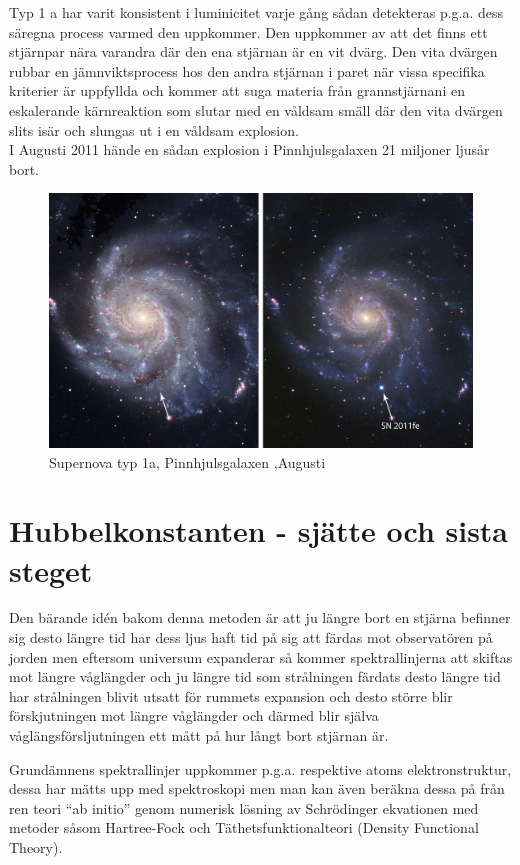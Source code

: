 \documentclass[./exercises.tex]{subfiles}
\begin{document}
Typ 1 a har varit konsistent i luminicitet varje gång sådan detekteras p.g.a. dess säregna process
varmed den uppkommer. Den uppkommer av att det finns ett stjärnpar nära varandra där den ena stjärnan är en vit dvärg.
Den vita dvärgen rubbar en jämnviktsprocess hos den andra stjärnan i paret när vissa specifika kriterier
är uppfyllda och kommer att suga materia från grannstjärnani en eskalerande kärnreaktion som slutar med en våldsam
smäll där den vita dvärgen slits isär och slungas ut i en våldsam explosion.\\
I Augusti 2011 hände en sådan explosion i Pinnhjulsgalaxen 21 miljoner ljusår bort.
\begin{figure}[H]
\begin{center}
  \includegraphics[scale=0.25]{SuperNova_2011fe.jpg}
  \caption{Supernova typ 1a, Pinnhjulsgalaxen ,Augusti }
  \end{center}
  \label{fig4}
\end{figure}
\section{Hubbelkonstanten - sjätte och sista steget}

Den bärande id\'en bakom denna metoden är att ju längre bort en stjärna befinner sig desto längre tid har dess
ljus haft tid på sig att färdas mot observatören på jorden men eftersom universum expanderar så kommer
spektrallinjerna att skiftas mot längre våglängder och ju längre tid som strålningen färdats desto längre tid
har strålningen blivit utsatt för rummets expansion och desto större blir förskjutningen mot längre våglängder
och därmed blir själva våglängsförsljutningen ett mått på hur långt bort stjärnan är.

Grundämnens spektrallinjer uppkommer p.g.a. respektive atoms elektronstruktur, dessa har mätts upp
med spektroskopi men man kan även beräkna dessa på från ren teori ``ab initio'' genom numerisk lösning
av Schrödinger ekvationen med metoder såsom Hartree-Fock och Täthetsfunktionalteori (Density Functional Theory).\\
\end{document}
